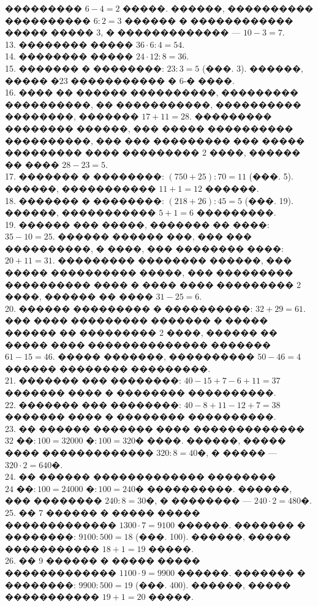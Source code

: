 \documentclass[12pt]{article}
\begin{document}
��������� $6-4=2$ �����. ������, ���������� ���������� $6:2=3$ ������ � ������������ ����� ����� 3, � ������������� --- $10-3=7.$\\
13. �������� ����� $36\cdot6:4=54.$\\
14. �������� ����� $24\cdot12:8=36.$\\
15. ������� � ��������: $23:3=5$ (���. 3). ������, ����� �23 ����������� � 6-� ����.\\
16. ���� �� ������ ����������, ��������� ����������, �� �����������, ���������� ��������, ������� $17+11=28.$ ��������� �������� ������, ��� ����� ���������� ����������, ��� ��� ��������� ��� ����� ��������� ���� ��������� 2 ����, ������ �� ���� $28-23=5.$\\
17. ������� � ��������: $(750+25):70=11$ (���. 5). ������, ����������� $11+1=12$ ������.\\
18. ������� � ��������: $(218+26):45=5$ (���. 19). ������, ����������� $5+1=6$ ���������.\\
19. ������ ��� �����, ������� �� ����: $35-10=25.$ ������ ������ ���, ��� ��� ����������, � ����, ��� �������� ����: $20+11=31.$ ��������� �������� ������, ��� ����� ���������� �����, ��� ��������� ���������� ���� � ���� ���� ��������� 2 ����, ������ �� ���� $31-25=6.$\\
20. ������ ��������� � ����������: $32+29=61.$ ��� ���� ��������� ������� � ����� ������ �� ��������� 2 ����, ������ �� ����� ���� �������������� ������� $61-15=46.$ ����� �������, ���������� $50-46=4$ ������ �������� ���������.\\
21. ������� ��� ��������: $40-15+7-6+11=37$ ������� ���� � �������� ����������.\\
22. ������� ��� ��������: $40-8+11-12+7=38$ ������� ���� � �������� ����������.\\
23. �� ������ ������� ���� ������������� $32\text{ ��}:100=32000\text{ �}:100=320$� ����. ������, ����� ���� ������������� $320:8=40$�, � ����� --- $320\cdot2=640$�.\\
24. �� ������ ������������� �������� $24\text{ ��}:100=24000\text{ �}:100=240$� ����������. ������, ��� �������� $240:8=30$�, � �������� --- $240\cdot2=480$�.\\
25. �� 7 ������ � ����� ����� ������������� $1300\cdot7=9100$ ������. ������� � ��������: $9100:500=18$ (���. 100). ������, ����� ����������� $18+1=19$ �����.\\
26. �� 9 ������ � ����� ����� ������������� $1100\cdot9=9900$ ������. ������� � ��������: $9900:500=19$ (���. 400). ������, ����� ����������� $19+1=20$ �����.\\
\end{document}
